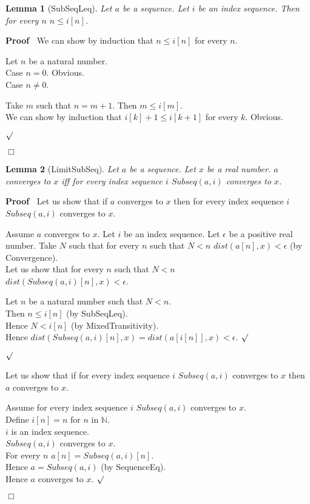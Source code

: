 \documentclass{article}
\newenvironment{forthel}{\begin{leftbar}}{\end{leftbar}}
\newenvironment{proof}{\noindent\textbf{Proof\ }}{\hspace*{\fill}$\Box$\medskip}
\newenvironment{subproof}{\begin{list}{}{}
		\item[\text{Proof}]}{\hfill $\surd$ \end{list}}
\newenvironment{case}{\begin{list}{}{}
		\item[]}{\end{list}}
\newtheorem{lemma}{Lemma}
\newcommand{\NN}{\mathbb{N}}
\begin{document}
\begin{forthel}
	\begin{lemma}[SubSeqLeq]
		Let $a$ be a sequence. Let $i$ be an index sequence. Then for every $n$ $n \leq i[n]$.
	\end{lemma}
	
	\begin{proof}
		We can show by induction that $n \leq i[n]$ for every $n$.
		\begin{subproof}
			Let $n$ be a natural number.\\
			Case $n = 0$. Obvious.\\
			Case $n \neq 0$.
			\begin{case}
				Take $m$ such that $n = m + 1$. Then $m \leq i[m]$.\\
				We can show by induction that $i[k] + 1 \leq i[k + 1]$ for every $k$. Obvious.
			\end{case}
		\end{subproof}
	\end{proof}
	
	\begin{lemma}[LimitSubSeq]
		Let $a$ be a sequence. Let $x$ be a real number. $a$ converges to $x$ iff for every index sequence $i$ $Subseq(a,i)$ converges to $x$. 
	\end{lemma}
	\begin{proof}
		Let us show that if $a$ converges to $x$ then for every index sequence $i$ $Subseq(a,i)$ converges to $x$.
		
		\begin{subproof}
			Assume $a$ converges to $x$. 
			Let $i$ be an index sequence.
			Let $\epsilon$ be a positive real number.
			Take $N$ such that for every $n$ such that $N < n$ $dist(a[n],x) < \epsilon$ (by Convergence).
			\\Let us show that for every $n$ such that $N < n$ \\ $dist(Subseq(a,i)[n],x) < \epsilon$.
			\begin{subproof}
				Let $n$ be a natural number such that $N < n$.\\
				Then $n \leq i[n]$ (by SubSeqLeq).\\
				Hence $N < i[n]$ (by MixedTransitivity).\\
				Hence $dist(Subseq(a,i)[n],x) = dist(a[i[n]],x) < \epsilon$.
			\end{subproof}
		\end{subproof}
		Let us show that if for every index sequence $i$ $Subseq(a,i)$ converges to $x$ then $a$ converges to $x$.
		\begin{subproof}
			Assume for every index sequence $i$ $Subseq(a,i)$ converges to $x$. \\
			Define $i[n] = n$ for $n$ in $\NN$.\\
			$i$ is an index sequence.\\
			$Subseq(a,i)$ converges to $x$. \\
			For every $n$ $a[n] = Subseq(a,i)[n]$. \\
			Hence $a = Subseq(a,i)$ (by SequenceEq). \\
			Hence $a$ converges to $x$.
		\end{subproof}
	\end{proof}
	

\end{forthel}
\end{document}
